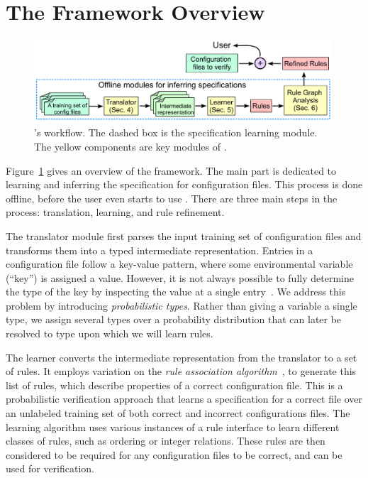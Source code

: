 
\section{The \app Framework Overview}

\begin{figure}[tbp] \centering
\includegraphics[width=0.99\textwidth]{figs/overview}
\caption{\app's workflow.
  The dashed box is the specification learning module. 
  The yellow components are key modules of \app.}
\label{fig-overview}
\end{figure}

Figure~\ref{fig-overview} gives an overview of the \app framework.
The main part is dedicated to 
learning and inferring the specification for configuration 
files. This process is done offline, before the user even starts 
to use \app. There are three main steps in the process:
translation, learning, and rule refinement.

The translator module first parses the input training  
set of configuration files and transforms them into 
a typed intermediate representation.
Entries in a configuration file follow a key-value pattern, 
where some environmental variable (``key'') is assigned a value.
However, it is not always possible to fully determine the type of the key
by inspecting the value at a single entry~\cite{xu15hey}.
We address this problem 
by introducing {\em probabilistic types}.
Rather than giving a variable a single type, 
we assign several types over a probability distribution that can later be resolved to type upon which we will learn rules.

The learner converts the intermediate representation from the translator to a set of rules.
It employs variation on the {\em rule association 
algorithm}~\cite{agrawal1993mining}, to generate this list of rules, which describe properties of a correct configuration file. 
This is a probabilistic verification approach that learns a specification for a correct file over an unlabeled training set of both correct and incorrect configurations files.
The learning algorithm uses various instances of a rule interface to learn different classes of rules, such as ordering or integer relations.
These rules are then considered to be required for any configuration files to be correct, and can be used for verification.


